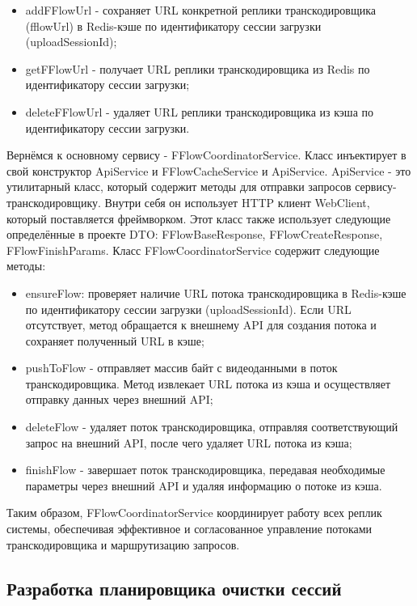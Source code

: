 	\begin{itemize}[label=$\bullet$]
		\item addFFlowUrl - сохраняет URL конкретной реплики транскодировщика (fflowUrl) в Redis-кэше по идентификатору сессии загрузки (uploadSessionId);
		\item getFFlowUrl - получает URL реплики транскодировщика из Redis по идентификатору сессии загрузки;
		\item deleteFFlowUrl - удаляет URL реплики транскодировщика из кэша по идентификатору сессии загрузки.
	\end{itemize}

	Вернёмся к основному сервису - FFlowCoordinatorService. Класс инъектирует в свой конструктор ApiService и FFlowCacheService и ApiService. ApiService - это утилитарный класс, который содержит методы для отправки запросов сервису-транскодировщику. Внутри себя он использует HTTP клиент WebClient, который поставляется фреймворком. Этот класс также использует следующие определённые в проекте DTO: FFlowBaseResponse, FFlowCreateResponse, FFlowFinishParams. Класс FFlowCoordinatorService содержит следующие методы:
	
	\begin{itemize}[label=$\bullet$]
		\item ensureFlow: проверяет наличие URL потока транскодировщика в Redis-кэше по идентификатору сессии загрузки (uploadSessionId). Если URL отсутствует, метод обращается к внешнему API для создания потока и сохраняет полученный URL в кэше;
		\item pushToFlow - отправляет массив байт с видеоданными в поток транскодировщика. Метод извлекает URL потока из кэша и осуществляет отправку данных через внешний API;
		\item deleteFlow - удаляет поток транскодировщика, отправляя соответствующий запрос на внешний API, после чего удаляет URL потока из кэша;
		\item finishFlow - завершает поток транскодировщика, передавая необходимые параметры через внешний API и удаляя информацию о потоке из кэша.
	\end{itemize}

	Таким образом, FFlowCoordinatorService координирует работу всех реплик системы, обеспечивая эффективное и согласованное управление потоками транскодировщика и маршрутизацию запросов.

	\subsection{Разработка планировщика очистки сессий}
	
